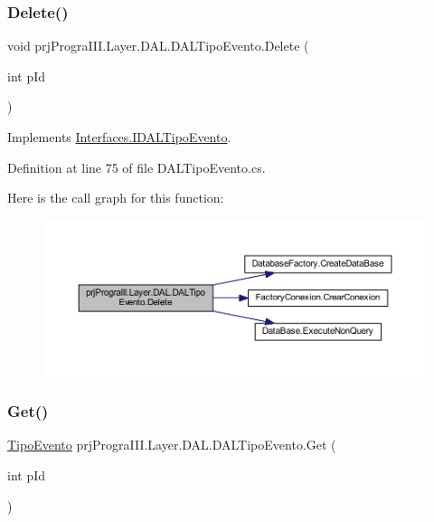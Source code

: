 \subsubsection{\texorpdfstring{Delete()}{Delete()}}
{\footnotesize\ttfamily void prj\+Progra\+I\+I\+I.\+Layer.\+D\+A\+L.\+D\+A\+L\+Tipo\+Evento.\+Delete (\begin{DoxyParamCaption}\item[{int}]{p\+Id }\end{DoxyParamCaption})}



Implements \hyperlink{interface_interfaces_1_1_i_d_a_l_tipo_evento_acf0a5891c0e73d557860b54f91e329a2}{Interfaces.\+I\+D\+A\+L\+Tipo\+Evento}.



Definition at line 75 of file D\+A\+L\+Tipo\+Evento.\+cs.

Here is the call graph for this function\+:
\nopagebreak
\begin{figure}[H]
\begin{center}
\leavevmode
\includegraphics[width=350pt]{classprj_progra_i_i_i_1_1_layer_1_1_d_a_l_1_1_d_a_l_tipo_evento_aa48ad58ea22d864d798ac515bb81f899_cgraph}
\end{center}
\end{figure}
\hypertarget{classprj_progra_i_i_i_1_1_layer_1_1_d_a_l_1_1_d_a_l_tipo_evento_a43ec574ca3071e7b497613178a67a0fe}{}\label{classprj_progra_i_i_i_1_1_layer_1_1_d_a_l_1_1_d_a_l_tipo_evento_a43ec574ca3071e7b497613178a67a0fe} 
\subsubsection{\texorpdfstring{Get()}{Get()}}
{\footnotesize\ttfamily \hyperlink{classprj_progra_i_i_i_1_1_layer_1_1_entities_1_1_tipo_evento}{Tipo\+Evento} prj\+Progra\+I\+I\+I.\+Layer.\+D\+A\+L.\+D\+A\+L\+Tipo\+Evento.\+Get (\begin{DoxyParamCaption}\item[{int}]{p\+Id }\end{DoxyParamCaption})}



